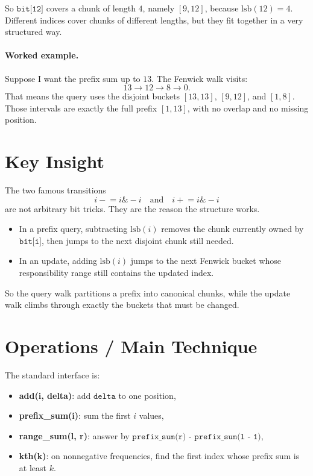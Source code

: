 So \(\texttt{bit[12]}\) covers a chunk of length \(4\), namely \([9, 12]\), because \(\mathrm{lsb}(12) = 4\).
Different indices cover chunks of different lengths, but they fit together in a very structured way.

\paragraph{Worked example.}
Suppose I want the prefix sum up to \(13\). The Fenwick walk visits:
\[
13 \rightarrow 12 \rightarrow 8 \rightarrow 0.
\]
That means the query uses the disjoint buckets \([13,13]\), \([9,12]\), and \([1,8]\). Those intervals are exactly
the full prefix \([1,13]\), with no overlap and no missing position.

\section*{Key Insight}

The two famous transitions
\[
i \mathrel{-}= i \& -i
\quad\text{and}\quad
i \mathrel{+}= i \& -i
\]
are not arbitrary bit tricks. They are the reason the structure works.

\begin{itemize}
  \item In a prefix query, subtracting \(\mathrm{lsb}(i)\) removes the chunk currently owned by \(\texttt{bit[i]}\),
  then jumps to the next disjoint chunk still needed.
  \item In an update, adding \(\mathrm{lsb}(i)\) jumps to the next Fenwick bucket whose responsibility range still
  contains the updated index.
\end{itemize}

So the query walk partitions a prefix into canonical chunks, while the update walk climbs through exactly the buckets
that must be changed.

\section*{Operations / Main Technique}

The standard interface is:

\begin{itemize}
  \item \textbf{add(i, delta)}: add \(\texttt{delta}\) to one position,
  \item \textbf{prefix\_sum(i)}: sum the first \(i\) values,
  \item \textbf{range\_sum(l, r)}: answer by \(\texttt{prefix\_sum(r) - prefix\_sum(l - 1)}\),
  \item \textbf{kth(k)}: on nonnegative frequencies, find the first index whose prefix sum is at least \(k\).
\end{itemize}

